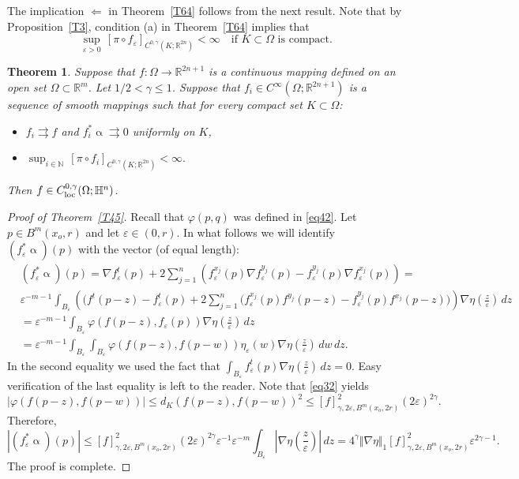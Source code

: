 \documentclass[intlimits,12pt,reqno]{amsart}
\newcommand{\bbbn}{\mathbb N}
\newcommand{\bbbh}{\mathbb H}
\newcommand{\R}{\mathbb R}
\newcommand{\eps}{\varepsilon}
\numberwithin{equation}{section}
\newtheorem{theorem}{Theorem}[section]
\theoremstyle{definition}
\begin{document}
The implication $\Leftarrow$ in Theorem~\ref{T64} follows from the next result. 
Note that by Proposition~\ref{T3}, condition (a) in Theorem~\ref{T64} implies that
$$
\sup_{\eps>0}\, [\pi\circ f_\eps]_{C^{0,\gamma}(K;\R^{2n})}<\infty
\quad
\text{if $K\subset\Omega$ is compact.}
$$
\begin{theorem}
\label{T65}
Suppose that $f:\Omega\to\R^{2n+1}$ is a continuous mapping defined on an open set $\Omega\subset\R^{m}$.
Let $1/2<\gamma\leq 1$.
Suppose that $f_i\in C^\infty(\Omega;\R^{2n+1})$ is a sequence of smooth mappings such that for every compact set $K\subset\Omega$:
\begin{itemize}
\item[(a)] $f_i\rightrightarrows f$ and $f_i^*\upalpha\rightrightarrows 0$ uniformly on $K$, 
\item[(b)] 
$
\sup_{i\in\bbbn}\, [\pi\circ f_i]_{C^{0,\gamma}(K;\R^{2n})}<\infty.
$
\end{itemize}
Then $f\in  C_{\rm loc}^{0,\gamma}(\Omega;\bbbh^n)$.
\end{theorem}
\begin{proof}[Proof of Theorem~\ref{T45}]
Recall that $\varphi(p,q)$ was defined in \eqref{eq42}. 
Let $p\in B^m(x_o,r)$ and let $\eps\in (0,r)$.
In what follows we will identify $(f^*_\eps\upalpha)(p)$ with the vector (of equal length):
\begin{equation*}
\begin{split}
&(f^*_\eps\upalpha)(p)=\nabla f^t_\eps(p)+2\sum_{j=1}^n (f_\eps^{x_j}(p)\nabla f_\eps^{y_j}(p)-f_\eps^{y_j}(p)\nabla f_\eps^{x_j}(p))=\\
&
\eps^{-m-1}\int_{B_\eps}
\left( \big(f^t(p-z)-f_\eps^t(p)+
2\sum_{j=1}^n(f_\eps^{x_j}(p)f^{y_j}(p-z)-f_\eps^{y_j}(p)f^{x_j}(p-z)\big)\right)\nabla\eta
\left(\frac{z}{\eps}\right)\, dz\\
&=
\eps^{-m-1}\int_{B_\eps} \varphi(f(p-z),f_\eps(p))\nabla\eta\left(\frac{z}{\eps}\right)\, dz\\
&=
\eps^{-m-1}\int_{B_\eps}\int_{B_\eps} \varphi(f(p-z),f(p-w))\eta_\eps(w)\nabla\eta\left(\frac{z}{\eps}\right)\, dw\, dz.
\end{split}    
\end{equation*}
In the second equality we used the fact that
$\int_{B_\eps}f^t_\eps(p)\nabla\eta\left(\frac{z}{\eps}\right)\, dz=0$.
Easy verification of the last equality is left to the reader.
Note that \eqref{eq32} yields
$$
|\varphi(f(p-z),f(p-w))|\leq d_K(f(p-z),f(p-w))^2\leq [f]_{\gamma,2\eps,B^m(x_o,2r)}^2(2\eps)^{2\gamma}.
$$
Therefore,
$$
|(f_\eps^*\upalpha)(p)|\leq 
[f]_{\gamma,2\eps,B^m(x_o,2r)}^2(2\eps)^{2\gamma}\eps^{-1}\eps^{-m}\int_{B_\eps}\left|\nabla\eta\left(\frac{z}{\eps}\right)\right|\, dz=
4^\gamma\Vert\nabla\eta\Vert_1[f]^2_{\gamma,2\eps,B^m(x_o,2r)}\eps^{2\gamma-1}.
$$
The proof is complete.
\end{proof}
\end{document}
